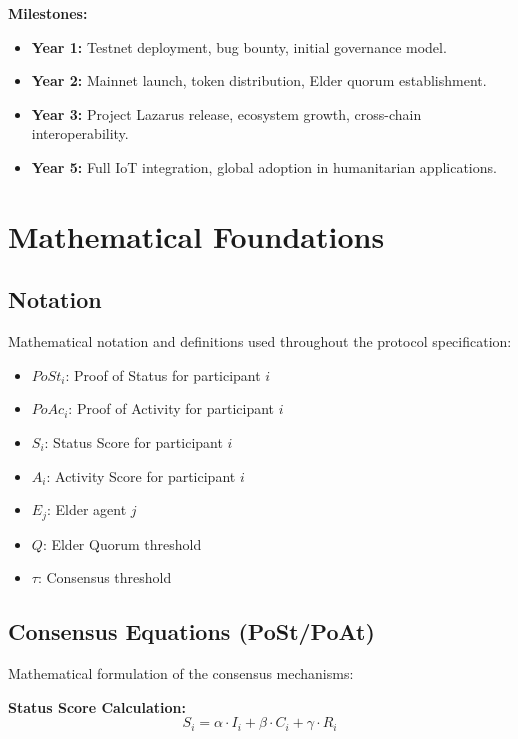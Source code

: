 \documentclass[11pt,a4paper]{article}
\begin{document}
\textbf{Milestones:}
\begin{itemize}
    \item \textbf{Year 1:} Testnet deployment, bug bounty, initial governance model.
    \item \textbf{Year 2:} Mainnet launch, token distribution, Elder quorum establishment.
    \item \textbf{Year 3:} Project Lazarus release, ecosystem growth, cross-chain interoperability.
    \item \textbf{Year 5:} Full IoT integration, global adoption in humanitarian applications.
\end{itemize}


\section{Mathematical Foundations}

\subsection{Notation}
Mathematical notation and definitions used throughout the protocol specification:
\begin{itemize}
    \item $PoSt_i$: Proof of Status for participant $i$
    \item $PoAc_i$: Proof of Activity for participant $i$
    \item $S_i$: Status Score for participant $i$
    \item $A_i$: Activity Score for participant $i$
    \item $E_j$: Elder agent $j$
    \item $Q$: Elder Quorum threshold
    \item $\tau$: Consensus threshold
\end{itemize}

\subsection{Consensus Equations (PoSt/PoAt)}
Mathematical formulation of the consensus mechanisms:

\textbf{Status Score Calculation:}
$$S_i = \alpha \cdot I_i + \beta \cdot C_i + \gamma \cdot R_i$$
\end{document}
